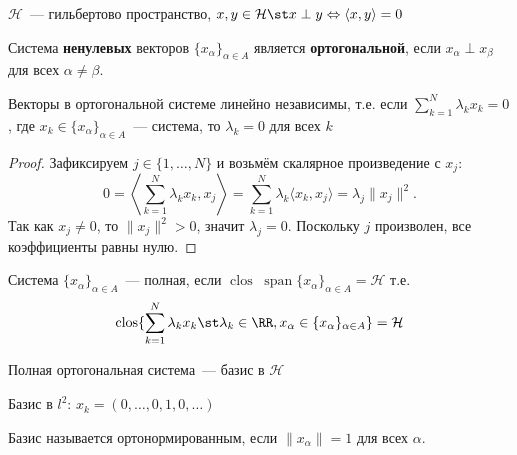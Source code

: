 \begin{Definition}{}{}
	$\mathcal{H}$~--- гильбертово пространство, $x, y \in \mathcal{H} \st x \perp y \Leftrightarrow  \langle x, y \rangle  = 0 $
	
	Система \textbf{ненулевых} векторов $\{x_\alpha\}_{\alpha \in A}$ является \textbf{ортогональной}, если $x_\alpha \perp x_\beta$ для всех $\alpha \neq \beta$.
\end{Definition}

\begin{Proposition}{}{}
	Векторы в ортогональной системе линейно независимы, т.е. если $\sum_{k=1}^N\lambda_k x_k = 0$, где $x_k \in \{x_\alpha\}_{\alpha \in A}$~--- система, то $\lambda_k = 0$ для всех $k$
\end{Proposition}

\begin{proof}
	Зафиксируем $j \in \{1,\ldots,N\}$ и возьмём скалярное произведение с $x_j$:
	\[
	0
	= \left\langle \sum_{k=1}^{N} \lambda_k x_k, x_j \right\rangle
	= \sum_{k=1}^{N} \lambda_k \langle x_k, x_j \rangle
	= \lambda_j \|x_j\|^2.
	\]
	Так как $x_j \neq 0$, то $\|x_j\|^2 > 0$, значит $\lambda_j = 0$. Поскольку $j$ произволен, все коэффициенты равны нулю.
\end{proof}

\begin{Definition}{}{}
	Система $\{x_\alpha\}_{\alpha \in A}$~--- полная, если  $ \operatorname{clos} \; \operatorname{span}\{x_\alpha\}_{\alpha \in A} = \mathcal{H} $ 	т.е. 
	\[ 
	\operatorname{clos} \{ \sum_{k=1}^N\lambda_kx_k \st \lambda_k \in \RR, x_\alpha \in \{x_\alpha\}_{\alpha \in A} \} =  \mathcal{H}
	\]
	
	Полная ортогональная система~--- $\textbf{базис}$ в  $\mathcal{H}$
\end{Definition}

\begin{Example}{}{}
	Базис в $l^2$: $x_k = (0, \ldots, 0, 1, 0, \ldots)$
\end{Example}

\begin{Definition}{}{}
	Базис называется ортонормированным, если $\|x_\alpha\| = 1$ для всех $\alpha$.
\end{Definition}

